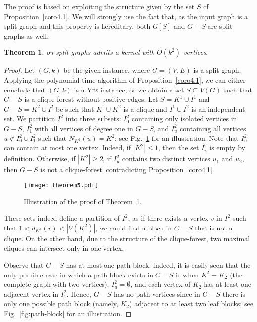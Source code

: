 \documentclass[
final
]{dmtcs-episciences}
\newtheorem{theorem}{Theorem}{\bfseries}{\itshape}
\begin{document}
The proof is based on exploiting the structure given by the set $S$ of Proposition~\ref{coro4.1}. We will strongly use the fact that, as  the input graph is a split graph and this property is hereditary, both $G[S]$ and $G-S$ are split graphs as well.

     \begin{theorem}\label{thm:quadratic-split}
	{} on split graphs admits a kernel with $O(k^2)$ vertices.
	\end{theorem}
     \begin{proof}
     Let $(G,k)$ be the given instance, where $G=(V,E)$ is a split graph. Applying the polynomial-time algorithm of Proposition~\ref{coro4.1}, we can either conclude that $(G,k)$ is a \textsc{Yes}-instance, or we obtain a set $S \subseteq V(G)$ such that $G-S$ is a clique-forest without positive edges. Let $S=K^1\cup I^1$ and $G-S=K^2\cup I^2$ be such that $K^1 \cup K^2$ is a clique and $I^1 \cup I^2$ is an independent set. We partition $I^2$ into three subsets: $I^2_0$ containing only isolated vertices in $G-S$, $I^2_1$ with all vertices of degree one in $G-S$, and $I^2_u$ containing all vertices $u \notin I^2_0 \cup I^2_1$ such that $N_{K^2}(u)=K^2$; see Fig.~\ref{fig:quadratic-split} for an illustration. Note that $I^2_u$ can contain at most one vertex. Indeed, if $|K^2| \leq 1$, then the set $I^2_u$ is empty by definition. Otherwise, if $|K^2| \geq 2$, if $I^2_u$ contains two distinct vertices $u_1$ and $u_2$, then $G-S$ is not a clique-forest, contradicting Proposition~\ref{coro4.1}.

\begin{figure}[h]
\begin{center} \texttt{[image: theorem5.pdf]}
\caption{Illustration of the proof of Theorem~\ref{thm:quadratic-split}.} \label{fig:quadratic-split} \end{center}
\end{figure}


     These sets indeed define a partition of $I^2$, as  if there exists a vertex $v$ in $I^2$ such that $1<d_{K^2}(v)<|V(K^2)|$, we could find a block in $G-S$ that is not a clique. On the other hand, due to the structure of the clique-forest, two maximal cliques can intersect only in one vertex.



     Observe that $G-S$ has at most one path block. Indeed, it is easily seen that the only possible case in which a path block exists in $G-S$ is when $K^2=K_2$ (the complete graph with two vertices), $I^2_u=\emptyset$, and each vertex of $K_2$ has at least one adjacent vertex in $I^2_1$. Hence, $G-S$ has no path vertices since in $G-S$ there is only one possible path block (namely, $K_2$) adjacent to at least two leaf blocks; see Fig.~\ref{fig:path-block} for an illustration.



\end{proof}
\end{document}
